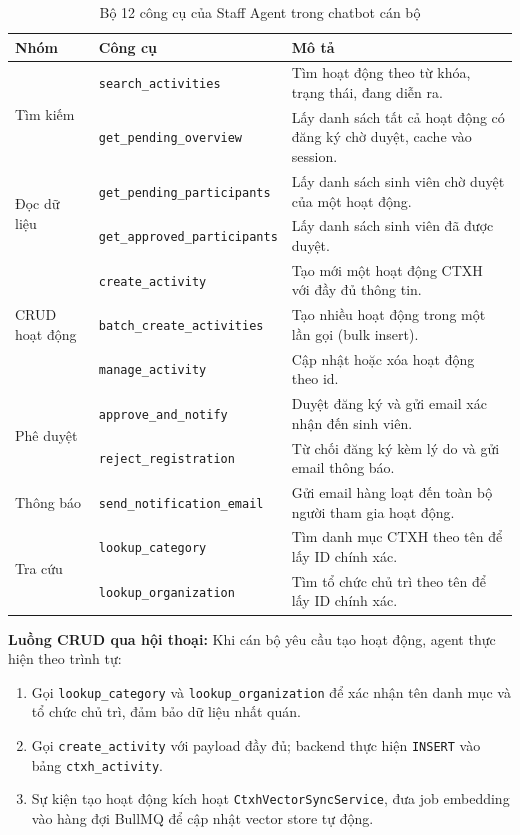 \begin{table}[H]
\centering
\renewcommand{\arraystretch}{1.25}
\begin{tabular}{|p{2.5cm}|p{4.5cm}|p{7.5cm}|}
\hline
\textbf{Nhóm} & \textbf{Công cụ} & \textbf{Mô tả} \\
\hline
\multirow{2}{*}{Tìm kiếm} & \texttt{search\_activities} & Tìm hoạt động theo từ khóa, trạng thái, đang diễn ra. \\
\cline{2-3}
 & \texttt{get\_pending\_overview} & Lấy danh sách tất cả hoạt động có đăng ký chờ duyệt, cache vào session. \\
\hline
\multirow{2}{*}{Đọc dữ liệu} & \texttt{get\_pending\_participants} & Lấy danh sách sinh viên chờ duyệt của một hoạt động. \\
\cline{2-3}
 & \texttt{get\_approved\_participants} & Lấy danh sách sinh viên đã được duyệt. \\
\hline
\multirow{3}{*}{CRUD hoạt động} & \texttt{create\_activity} & Tạo mới một hoạt động CTXH với đầy đủ thông tin. \\
\cline{2-3}
 & \texttt{batch\_create\_activities} & Tạo nhiều hoạt động trong một lần gọi (bulk insert). \\
\cline{2-3}
 & \texttt{manage\_activity} & Cập nhật hoặc xóa hoạt động theo id. \\
\hline
\multirow{2}{*}{Phê duyệt} & \texttt{approve\_and\_notify} & Duyệt đăng ký và gửi email xác nhận đến sinh viên. \\
\cline{2-3}
 & \texttt{reject\_registration} & Từ chối đăng ký kèm lý do và gửi email thông báo. \\
\hline
Thông báo & \texttt{send\_notification\_email} & Gửi email hàng loạt đến toàn bộ người tham gia hoạt động. \\
\hline
\multirow{2}{*}{Tra cứu} & \texttt{lookup\_category} & Tìm danh mục CTXH theo tên để lấy ID chính xác. \\
\cline{2-3}
 & \texttt{lookup\_organization} & Tìm tổ chức chủ trì theo tên để lấy ID chính xác. \\
\hline
\end{tabular}
\caption{Bộ 12 công cụ của Staff Agent trong chatbot cán bộ}
\end{table}

\textbf{Luồng CRUD qua hội thoại:} Khi cán bộ yêu cầu tạo hoạt động, agent thực hiện theo trình tự:
\begin{enumerate}
	\item Gọi \texttt{lookup\_category} và \texttt{lookup\_organization} để xác nhận tên danh mục và tổ chức chủ trì, đảm bảo dữ liệu nhất quán.
	\item Gọi \texttt{create\_activity} với payload đầy đủ; backend thực hiện \texttt{INSERT} vào bảng \texttt{ctxh\_activity}.
	\item Sự kiện tạo hoạt động kích hoạt \texttt{CtxhVectorSyncService}, đưa job embedding vào hàng đợi BullMQ để cập nhật vector store tự động.
\end{enumerate}

